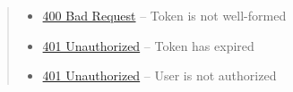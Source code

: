 \documentclass[letterpaper,10pt,english]{sphinxmanual}
\begin{document}
\begin{fulllineitems}
\begin{quote}
\begin{description}
\begin{itemize}
\item {} 
\href{http://www.w3.org/Protocols/rfc2616/rfc2616-sec10.html\#sec10.4.1}{400 Bad Request} -- Token is not well-formed

\item {} 
\href{http://www.w3.org/Protocols/rfc2616/rfc2616-sec10.html\#sec10.4.2}{401 Unauthorized} -- Token has expired

\item {} 
\href{http://www.w3.org/Protocols/rfc2616/rfc2616-sec10.html\#sec10.4.2}{401 Unauthorized} -- User is not authorized

\end{itemize}

\end{description}\end{quote}

\end{fulllineitems}
\end{document}
